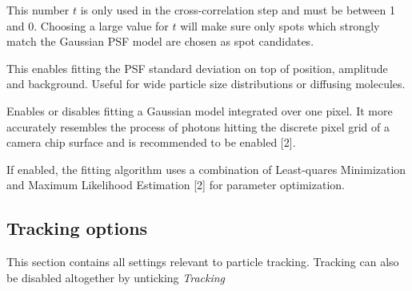 \item[Threshold] This number $t$ is only used in the cross-correlation step and must be between 1 and 0. Choosing a large value for $t$ will make sure only spots which strongly match the Gaussian PSF model are chosen as spot candidates.\\[10pt]%
%
\item[Fit PSF std. dev.] This enables fitting the PSF standard deviation on top of position, amplitude and background. Useful for wide particle size distributions or diffusing molecules.
\item[Pixel integrated fit] Enables or disables fitting a Gaussian model integrated over one pixel. It more accurately resembles the process of photons hitting the discrete pixel grid of a camera chip surface and is recommended to be enabled [2].
\item[Maximum Likelihood refinement] If enabled, the fitting algorithm uses a combination of Least-quares Minimization and Maximum Likelihood Estimation [2] for parameter optimization.

\subsection*{Tracking options}
This section contains all settings relevant to particle tracking. Tracking can also be disabled altogether by unticking \textit{Tracking}

